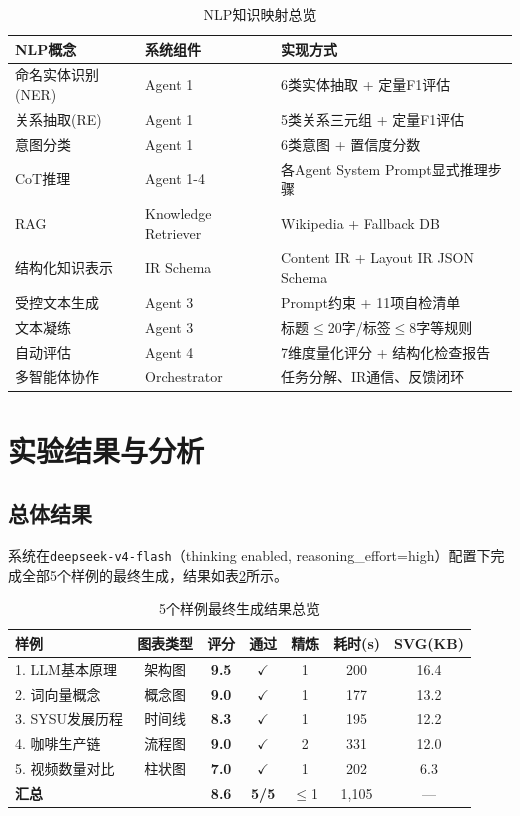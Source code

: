 \documentclass[11pt,a4paper]{article}
\begin{document}
\begin{table}[H]
\centering
\caption{NLP知识映射总览}
\label{tab:nlp_map}
\begin{tabular}{lll}
\toprule
NLP概念 & 系统组件 & 实现方式 \\
\midrule
命名实体识别(NER) & Agent 1 & 6类实体抽取 + 定量F1评估 \\
关系抽取(RE) & Agent 1 & 5类关系三元组 + 定量F1评估 \\
意图分类 & Agent 1 & 6类意图 + 置信度分数 \\
CoT推理 & Agent 1-4 & 各Agent System Prompt显式推理步骤 \\
RAG & Knowledge Retriever & Wikipedia + Fallback DB \\
结构化知识表示 & IR Schema & Content IR + Layout IR JSON Schema \\
受控文本生成 & Agent 3 & Prompt约束 + 11项自检清单 \\
文本凝练 & Agent 3 & 标题$\le$20字/标签$\le$8字等规则 \\
自动评估 & Agent 4 & 7维度量化评分 + 结构化检查报告 \\
多智能体协作 & Orchestrator & 任务分解、IR通信、反馈闭环 \\
\bottomrule
\end{tabular}
\end{table}

\section{实验结果与分析}

\subsection{总体结果}

系统在\texttt{deepseek-v4-flash}（thinking enabled, reasoning\_effort=high）配置下完成全部5个样例的最终生成，结果如表\ref{tab:overall}所示。

\begin{table}[H]
\centering
\caption{5个样例最终生成结果总览}
\label{tab:overall}
\begin{tabular}{lcccccc}
\toprule
样例 & 图表类型 & 评分 & 通过 & 精炼 & 耗时(s) & SVG(KB) \\
\midrule
1. LLM基本原理 & 架构图 & \textbf{9.5} & $\checkmark$ & 1 & 200 & 16.4 \\
2. 词向量概念 & 概念图 & \textbf{9.0} & $\checkmark$ & 1 & 177 & 13.2 \\
3. SYSU发展历程 & 时间线 & \textbf{8.3} & $\checkmark$ & 1 & 195 & 12.2 \\
4. 咖啡生产链 & 流程图 & \textbf{9.0} & $\checkmark$ & 2 & 331 & 12.0 \\
5. 视频数量对比 & 柱状图 & \textbf{7.0} & $\checkmark$ & 1 & 202 & 6.3 \\
\midrule
\multicolumn{2}{l}{\textbf{汇总}} & \textbf{8.6} & \textbf{5/5} & $\le$1 & 1,105 & — \\
\bottomrule
\end{tabular}
\end{table}
\end{document}
